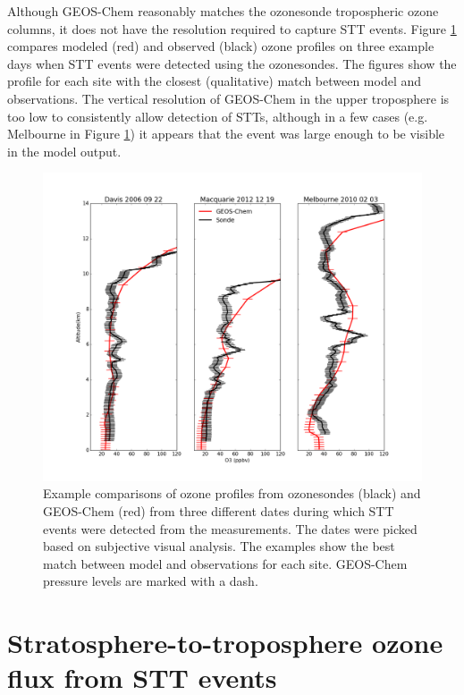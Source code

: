 \documentclass{article}
\begin{document}
  Although GEOS-Chem reasonably matches the ozonesonde tropospheric ozone columns, it does not have the resolution required to capture STT events.
  Figure \ref{fig:event_profile_comparison} compares modeled (red) and observed (black) ozone profiles on three example days when STT events were detected using the ozonesondes. 
  The figures show the profile for each site with the closest (qualitative) match between model and observations.
  The vertical resolution of GEOS-Chem in the upper troposphere is too low to consistently allow detection of STTs, although in a few cases (e.g. Melbourne in Figure \ref{fig:event_profile_comparison}) it appears that the event was large enough to be visible in the model output.
  
  \begin{figure}[!htbp]
    \includegraphics[width=\textwidth]{figures/event_profile_comparison.png}
    \caption{%
      Example comparisons of ozone profiles from ozonesondes (black) and GEOS-Chem (red) from three different dates during which STT events were detected from the measurements.
      The dates were picked based on subjective visual analysis. 
      The examples show the best match between model and observations for each site.
      GEOS-Chem pressure levels are marked with a dash.}
    \label{fig:event_profile_comparison}
  \end{figure}
  
\section{Stratosphere-to-troposphere ozone flux from STT events}
  
\end{document}

